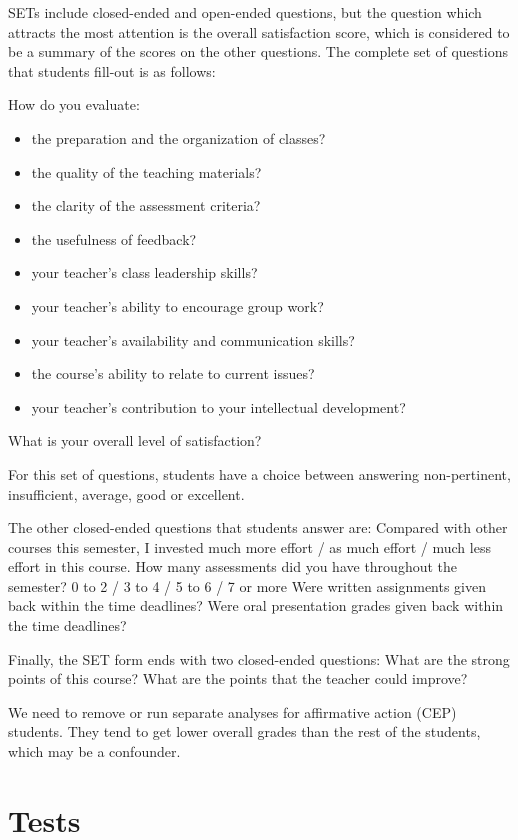 \documentclass[12pt]{article}
\begin{document}
SETs include closed-ended and open-ended questions, but the question which attracts the most attention is the overall 
satisfaction score, which is considered to be a summary of the scores on the other questions. The complete set of questions 
that students fill-out is as follows:

How do you evaluate:
\begin{itemize}
\item the preparation and the organization of classes?    
\item the quality of the teaching materials?
\item the clarity of the assessment criteria?
\item the usefulness of feedback?
\item your teacher's class leadership skills?
\item your teacher's ability to encourage group work? 
\item your teacher's availability and communication skills?
\item the course's ability to relate to current issues?
\item your teacher's contribution to your intellectual development?
\end{itemize}

What is your overall level of satisfaction?

For this set of questions, students have a choice between answering non-pertinent, insufficient, average, good or excellent.

The other closed-ended questions that students answer are:
Compared with other courses this semester, I invested much more effort / as much effort / much less effort in this course. 
How many assessments did you have throughout the semester? 
0 to 2 / 3 to 4 / 5 to 6 / 7 or more
Were written assignments given back within the time deadlines?
Were oral presentation grades given back within the time deadlines? 

Finally, the SET form ends with two closed-ended questions: 
What are the strong points of this course? 
What are the points that the teacher could improve?      


We need to remove or run separate analyses for affirmative action (CEP) students. They tend to get lower overall 
grades than the rest of the students, which may be a confounder.

\section{Tests}
\end{document}
